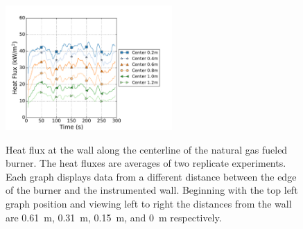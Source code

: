 \documentclass[twoside]{uocthesis}
\begin{document}
{\begin{figure}[ht!]
	\includegraphics[width=2.5in]{../Figures/TWNG07_HF_Center_Avg}\\
	\caption[Heat flux at the wall along the centerline of the natural gas fueled burner]{Heat flux at the wall along the centerline of the natural gas fueled burner. The heat fluxes are averages of two replicate experiments. Each graph displays data from a different distance between the edge of the burner and the instrumented wall. Beginning with the top left graph position and viewing left to right the distances from the wall are 0.61~m, 0.31~m, 0.15~m, and 0~m respectively.}
	\label{HF_Center_TWNG_comp}
\end{figure}


}
\end{document}
